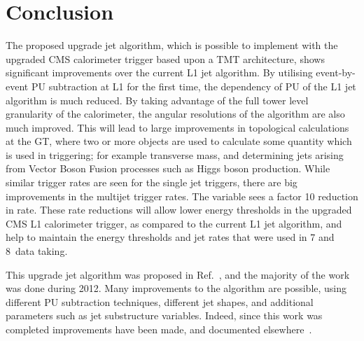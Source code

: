 \section{Conclusion}
The proposed upgrade jet algorithm, which is possible to implement with the upgraded \ac{CMS} calorimeter trigger based upon a \ac{TMT} architecture, shows significant improvements over the current \ac{L1} jet algorithm.
By utilising event-by-event \ac{PU} subtraction at \ac{L1} for the first time, the dependency of \ac{PU} of the \ac{L1} jet algorithm is much reduced.
By taking advantage of the full tower level granularity of the calorimeter, the angular resolutions of the algorithm are also much improved.
This will lead to large improvements in topological calculations at the \ac{GT}, where two or more objects are used to calculate some quantity which is used in triggering; for example transverse mass, and determining jets arising from Vector Boson Fusion processes such as Higgs boson production.
While similar trigger rates are seen for the single jet triggers, there are big improvements in the multijet trigger rates. 
The \HT variable sees a factor 10 reduction in rate.
These rate reductions will allow lower energy thresholds in the upgraded \ac{CMS} \ac{L1} calorimeter trigger, as compared to the current \ac{L1} jet algorithm, and help to maintain the energy thresholds and jet rates that were used in 7 and 8~\TeV data taking.


This upgrade jet algorithm was proposed in Ref.~\cite{Tapper:1556311}, and the majority of the work was done during 2012. 
Many improvements to the algorithm are possible, using different \ac{PU} subtraction techniques, different jet shapes, and additional parameters such as jet substructure variables.
Indeed, since this work was completed improvements have been made, and documented elsewhere~\cite{recentL1jetWork}.

\clearpage